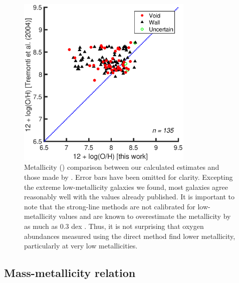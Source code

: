 \begin{figure}
    \centering
    \includegraphics[width=0.75\textwidth]{Images/Paper1/1sig_dwarf_I06_SF_t3_T04comparison}
    \caption[Metallicity comparison to \cite{Tremonti04}]{Metallicity (\OH) 
    comparison between our calculated estimates and those made by 
    \cite{Tremonti04}.  Error bars have been omitted for clarity.  Excepting the 
    extreme low-metallicity galaxies we found, most galaxies agree reasonably 
    well with the values already published.  It is important to note that the 
    strong-line methods \citep[like those used by][]{Tremonti04} are not 
    calibrated for low-metallicity values and are known to overestimate the 
    metallicity by as much as 0.3 dex \citep{Kennicutt03}.  Thus, it is not 
    surprising that oxygen abundances measured using the direct method find 
    lower metallicity, particularly at very low metallicities.}
    \label{fig:T04comp}
\end{figure}




\subsection{Mass-metallicity relation}

